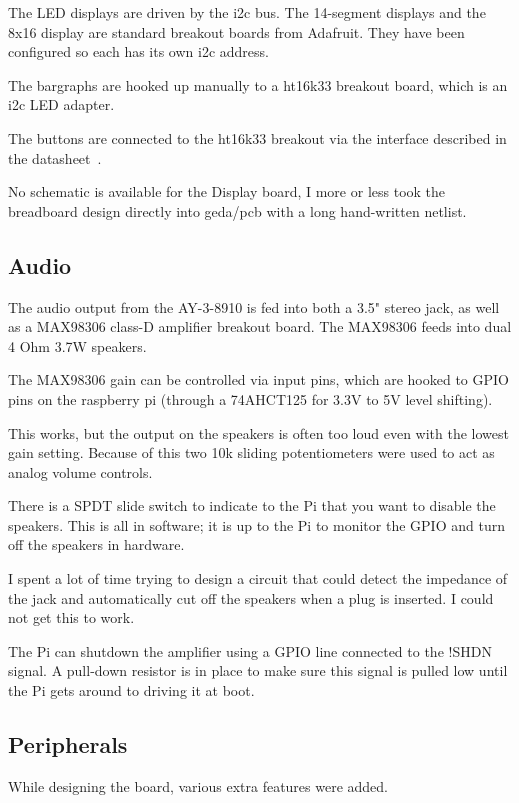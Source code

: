\documentclass[11pt]{article}
\begin{document}
The LED displays are driven by the i2c bus.
The 14-segment displays and the 8x16 display are standard breakout boards
from Adafruit.  They have been configured so each has its own 
i2c address.

The bargraphs are hooked up manually to a ht16k33 breakout board, which
is an i2c LED adapter.

The buttons are connected to the ht16k33 breakout via the interface
described in the datasheet~\cite{ht16k33}.

No schematic is available for the Display board, I more or less took the
breadboard design directly into geda/pcb with a long hand-written
netlist.

\subsection{Audio}

The audio output from the AY-3-8910 is fed into both a 3.5" stereo
jack, as well as a MAX98306 class-D amplifier breakout board.
The MAX98306 feeds into dual 4 Ohm 3.7W speakers.

The MAX98306 gain can be controlled via input pins, which are hooked to
GPIO pins on the raspberry pi (through a 74AHCT125 for 3.3V to 5V
level shifting).

This works, but the output on the speakers is often
too loud even with the lowest
gain setting.
Because of this two 10k sliding potentiometers were used to act as analog
volume controls.

There is a SPDT slide switch to indicate to the Pi that you want to disable
the speakers.
This is all in software; it is up to the Pi to monitor the GPIO and turn
off the speakers in hardware.

I spent a lot of time trying to design a circuit that could detect the
impedance of the jack and automatically cut off the speakers when a
plug is inserted.
I could not get this to work.

The Pi can shutdown the amplifier using a GPIO line connected to the
!SHDN signal.
A pull-down resistor is in place to make sure this signal is pulled low
until the Pi gets around to driving it at boot.

\subsection{Peripherals}

While designing the board, various extra features were added.
\end{document}
